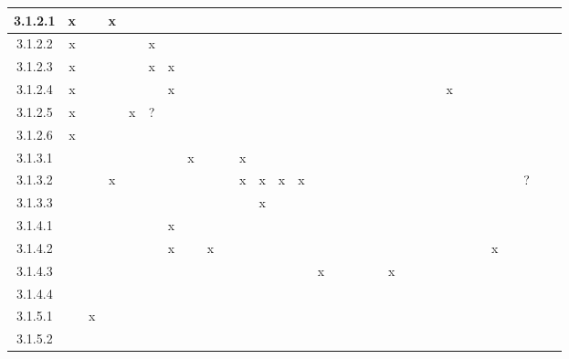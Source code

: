 \documentclass[titlepage]{article}
\begin{document}
\begin{center}
\begin{tabular}{ | c || c | c | c | c | c | c | c | c | c | c | c | c | c | c | c | c | c | c | c | c | c | c | c | c | c | c | c | c | c | c |}
\hline
   3.1.2.1 &x& &x& & & & & & & & & & & & & & & & & & & & & & & & & & &  \\ \hline
   3.1.2.2 &x& & & &x& & & & & & & & & & & & & & & & & & & & & & & & & \\ \hline
   3.1.2.3 &x& & & &x&x& & & & & & & & & & & & & & & & & & & & & & & & \\ \hline 
   3.1.2.4 &x& & & & &x& & & & & & & & & & & & & & & & &x& & & & & & & \\ \hline
   3.1.2.5 &x& & &x&?& & & & & & & & & & & & & & & & & & & & & & & & & \\ \hline
   3.1.2.6 &x& & & & & & & & & & & & & & & & & & & & & & & & & & & & & \\ \hline
   3.1.3.1 & & & & & & &x& & &x& & & & & & & & & & & & & & & & & & & & \\ \hline
   3.1.3.2 & & &x& & & & & & &x&x&x&x& & & & & & & & & & & & & & &?& & \\ \hline
   3.1.3.3 & & & & & & & & & & &x& & & & & & & & & & & & & & & & & & & \\ \hline
   3.1.4.1 & & & & & &x& & & & & & & & & & & & & & & & & & & & & & & & \\ \hline
   3.1.4.2 & & & & & &x& &x& & & & & & & & & & & & & & & & & &x& & & & \\ \hline
   3.1.4.3 & & & & & & & & & & & & & &x& & & & &x& & & & & & & & & & & \\ \hline
   3.1.4.4 & & & & & & & & & & & & & & & & & & & & & & & & & & & & & & \\ \hline
   3.1.5.1 & &x& & & & & & & & & & & & & & & & & & & & & & & & & & & & \\ \hline
   3.1.5.2 & & & & & & & & & & & & & & & & & & & & & & & & & & & & & & \\ \hline

\end{tabular}
\end{center}
\end{document}
